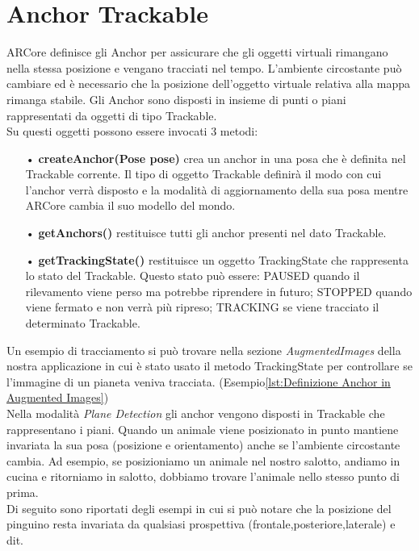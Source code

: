 \documentclass[crop=false, class=book]{standalone}
\begin{document}
		
	\chapter{Anchor Trackable}
	
		ARCore definisce gli Anchor per assicurare che gli oggetti virtuali rimangano nella stessa posizione e vengano 					tracciati nel tempo. L'ambiente circostante può cambiare ed è necessario che la posizione dell'oggetto virtuale 				relativa alla mappa rimanga stabile. Gli Anchor sono disposti in insieme di punti o piani rappresentati da oggetti di 			tipo Trackable. \\
		Su questi oggetti possono essere invocati 3 metodi:
		\begin{itemize}
			\item[•] \textbf{createAnchor(Pose pose)} crea un anchor in una posa che è definita nel Trackable corrente. Il tipo di oggetto Trackable definirà il modo con cui l'anchor verrà disposto e la modalità di aggiornamento della sua posa mentre ARCore cambia il suo modello del mondo.
			\item[•] \textbf{ getAnchors()} restituisce tutti gli anchor presenti nel dato Trackable.
			\item[•] \textbf{getTrackingState()} restituisce un oggetto TrackingState che rappresenta lo stato del Trackable. Questo stato può essere: PAUSED quando il rilevamento viene perso ma potrebbe riprendere in futuro; STOPPED quando viene fermato e non verrà più ripreso; TRACKING se viene tracciato il determinato Trackable.
		\end{itemize}

	\begin{flushleft}
		Un esempio di tracciamento si può trovare nella sezione \emph{AugmentedImages} della nostra applicazione in cui è stato 		usato il metodo TrackingState per controllare se l'immagine di un pianeta veniva tracciata. 		 			(Esempio\vref{lst:Definizione Anchor in Augmented Images})\\
		Nella modalità \emph{Plane Detection} gli anchor vengono disposti in Trackable che rappresentano i piani. Quando un animale viene posizionato in punto mantiene invariata la sua posa (posizione e orientamento) anche se l'ambiente circostante cambia. Ad esempio, se posizioniamo un animale nel nostro salotto, andiamo in cucina e ritorniamo in salotto, dobbiamo trovare l'animale nello stesso punto di prima.\\
		
		Di seguito sono riportati degli esempi in cui si può notare che la posizione del pinguino resta invariata da qualsiasi 			prospettiva (frontale,posteriore,laterale) e dit.
	\end{flushleft}
	
\end{document}
